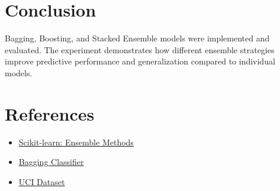 \documentclass[11pt]{article}
\begin{document}
\section*{Conclusion}
Bagging, Boosting, and Stacked Ensemble models were implemented and evaluated.  
The experiment demonstrates how different ensemble strategies improve predictive performance and generalization compared to individual models.


\section*{References}
\begin{itemize}
    \item \href{https://scikit-learn.org/stable/modules/ensemble.html}{Scikit-learn: Ensemble Methods}
    \item \href{https://scikit-learn.org/stable/modules/generated/sklearn.ensemble.BaggingClassifier.html}{Bagging Classifier}
    \item \href{https://archive.ics.uci.edu/dataset/17/breast+cancer+wisconsin+diagnostic}{UCI Dataset}
\end{itemize}
\end{document}
